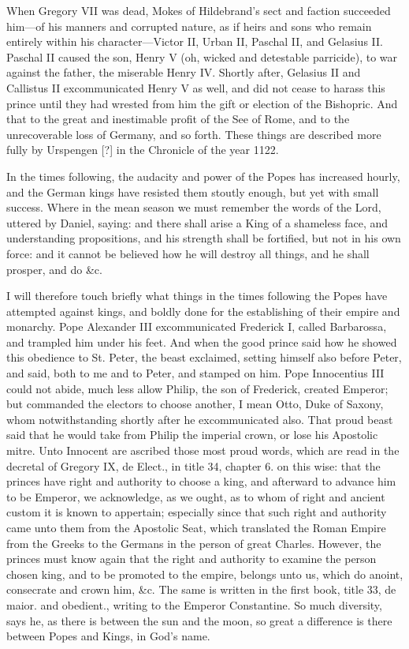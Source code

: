 When Gregory VII was dead, Mokes of Hildebrand’s sect and faction succeeded him—of his manners and corrupted nature, as if heirs and sons who remain entirely within his character—Victor II, Urban II, Paschal II, and Gelasius II. Paschal II caused the son, Henry V (oh, wicked and detestable parricide), to war against the father, the miserable Henry IV. Shortly after, Gelasius II and Callistus II excommunicated Henry V as well, and did not cease to harass this prince until they had wrested from him the gift or election of the Bishopric. And that to the great and inestimable profit of the See of Rome, and to the unrecoverable loss of Germany, and so forth. These things are described more fully by Urspengen [?] in the Chronicle of the year 1122.

In the times following, the audacity and power of the Popes has increased hourly, and the German kings have resisted them stoutly enough, but yet with small success. Where in the mean season we must remember the words of the Lord, uttered by Daniel, saying: and there shall arise a King of a shameless face, and understanding propositions, and his strength shall be fortified, but not in his own force: and it cannot be believed how he will destroy all things, and he shall prosper, and do \&c.

I will therefore touch briefly what things in the times following the Popes have attempted against kings, and boldly done for the establishing of their empire and monarchy. Pope Alexander III excommunicated Frederick I, called Barbarossa, and trampled him under his feet. And when the good prince said how he showed this obedience to St. Peter, the beast exclaimed, setting himself also before Peter, and said, both to me and to Peter, and stamped on him. Pope Innocentius III could not abide, much less allow Philip, the son of Frederick, created Emperor; but commanded the electors to choose another, I mean Otto, Duke of Saxony, whom notwithstanding shortly after he excommunicated also. That proud beast said that he would take from Philip the imperial crown, or lose his Apostolic mitre. Unto Innocent are ascribed those most proud words, which are read in the decretal of Gregory IX, de Elect., in title 34, chapter 6. on this wise: that the princes have right and authority to choose a king, and afterward to advance him to be Emperor, we acknowledge, as we ought, as to whom of right and ancient custom it is known to appertain; especially since that such right and authority came unto them from the Apostolic Seat, which translated the Roman Empire from the Greeks to the Germans in the person of great Charles. However, the princes must know again that the right and authority to examine the person chosen king, and to be promoted to the empire, belongs unto us, which do anoint, consecrate and crown him, \&c. The same is written in the first book, title 33, de maior. and obedient., writing to the Emperor Constantine. So much diversity, says he, as there is between the sun and the moon, so great a difference is there between Popes and Kings, in God’s name.

